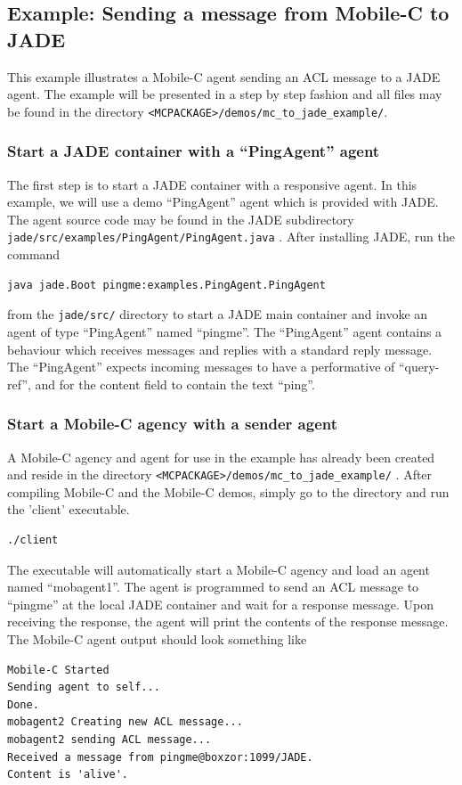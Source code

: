 \documentclass[11pt]{report}
\begin{document}
{\subsection{Example: Sending a message from Mobile-C to JADE}
This example illustrates a Mobile-C agent sending an ACL message to a
JADE agent.  The example will be presented in a step by step fashion and all
files may be found in the directory \texttt{<MCPACKAGE>/demos/mc\_to\_jade\_example/}.

\subsubsection{Start a JADE container with a ``PingAgent'' agent}
The first step is to start a JADE container with a responsive agent. In this
example, we will use a demo ``PingAgent'' agent which is provided with JADE. The
agent source code may be found in the JADE subdirectory 
\texttt{jade/src/examples/PingAgent/PingAgent.java} . After installing JADE,
run the command
\begin{verbatim}
java jade.Boot pingme:examples.PingAgent.PingAgent
\end{verbatim}
from the \texttt{jade/src/} directory to start a JADE main container and 
invoke an agent of type ``PingAgent'' named ``pingme''. The ``PingAgent'' agent
contains a behaviour which receives messages and replies with a standard 
reply message. The ``PingAgent'' expects incoming messages to have a performative
of ``query-ref'', and for the content field to contain the text ``ping''. 

\subsubsection{Start a Mobile-C agency with a sender agent}
A Mobile-C agency and agent for use in the example has already been
created and reside in the directory \texttt{<MCPACKAGE>/demos/mc\_to\_jade\_example/} .
After compiling Mobile-C and the Mobile-C demos, simply go to the directory and
run the 'client' executable.
\begin{verbatim}
./client
\end{verbatim}
The executable will automatically start a Mobile-C agency and load an agent
named ``mobagent1''. The agent is programmed to send an ACL message to 
``pingme'' at the local JADE container and wait for a response message. 
Upon receiving the response, the agent will print the contents of the 
response message. The Mobile-C agent output should look something like
\begin{verbatim}
Mobile-C Started
Sending agent to self...
Done.
mobagent2 Creating new ACL message...
mobagent2 sending ACL message...
Received a message from pingme@boxzor:1099/JADE.
Content is 'alive'.
\end{verbatim}

}
\end{document}

